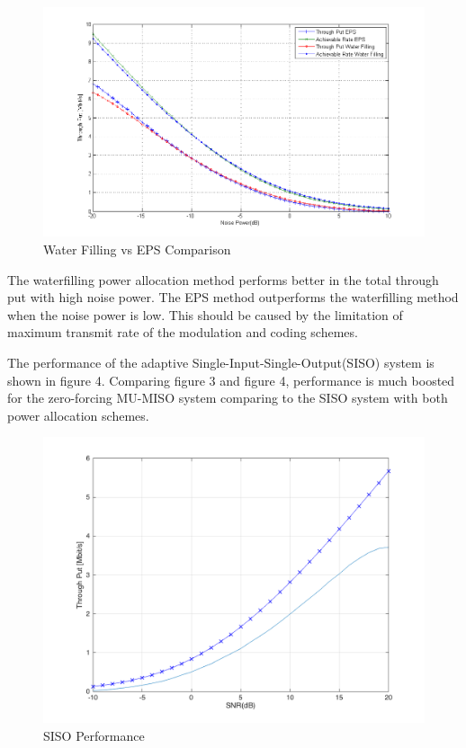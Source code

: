 \documentclass{article}
\begin{document}
\begin{figure}[ht]
\centering
\includegraphics[scale=0.45]{WFvsEPS.png}
\caption{Water Filling vs EPS Comparison}
\label{fig:MUSOvsSISO}
\end{figure}

\noindent
The waterfilling power allocation method performs better in the total through put with high noise power.
The EPS method outperforms the waterfilling method when the noise power is low. This should be caused by the limitation of maximum transmit rate of the modulation and coding schemes.

\noindent
The performance of the adaptive Single-Input-Single-Output(SISO) system is shown in figure 4. Comparing figure 3 and figure 4,
 performance is much boosted for the zero-forcing MU-MISO system comparing to the SISO system with both power allocation schemes.
\begin{figure}[ht]
\centering
\includegraphics[scale=0.25]{FadingSISO.png}
\caption{SISO Performance}
\label{fig:WFvsEPS}
\end{figure}
\end{document}
